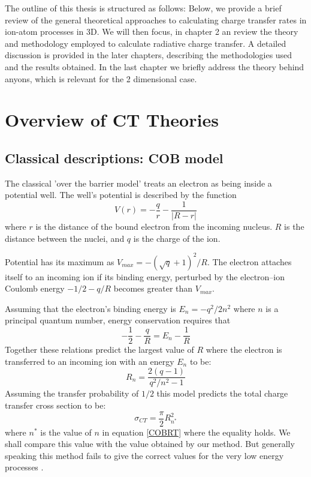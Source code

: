 The outline of this thesis is structured as follows: Below, we provide a brief review of the general theoretical approaches to calculating charge transfer rates in ion-atom processes in 3D. We will then focus, in chapter 2 an review the theory and methodology employed to calculate radiative charge transfer. A detailed discussion is provided in the later chapters, describing the methodologies used and the results obtained. In the last chapter we briefly address the theory behind anyons, which is relevant for the 2 dimensional case.

\section{Overview of CT Theories}
\subsection*{Classical descriptions: COB model}
The classical 'over the barrier model' \cite{BransdenMcDowell1992} treats an electron as being inside a potential well. The well's potential is described by the function
\begin{equation}
  V(r) = -\frac{q}{r} - \frac{1}{\lvert R - r \rvert}
\end{equation}
where $ r $ is the distance of the bound electron from the incoming nucleus. $ R $ is the distance between the nuclei, and $ q $ is the charge of the ion.

Potential has its maximum as $ V_{max} = -\left(\sqrt{q} + 1\right)^2/R $. The electron attaches itself to an incoming ion if its binding energy, perturbed by the electron–ion Coulomb energy $ -1/2 - q/R $ becomes greater than $ V_{max} $.

Assuming that the electron's binding energy is $ E_n = -q^2/2n^2 $ where $ n $ is a principal quantum number, energy conservation requires that
\begin{equation}
  -\frac{1}{2} - \frac{q}{R} = E_n - \frac{1}{R}
\end{equation}
Together these relations predict the largest value of $ R $ where the electron is transferred to an incoming ion with an energy $ E_n $ to be:
\begin{equation}\label{COBRT}
  R_n = \frac{2(q-1)}{q^2/n^2-1}
\end{equation}
Assuming the transfer probability of $ 1/2 $ this model predicts the total charge transfer cross section to be:
\begin{equation}
  \sigma_{CT} = \frac{\pi}{2}R_{n^*}^2
\end{equation}
where $ n^* $ is the value of $ n $ in equation \eqref{COBRT} where the equality holds. We shall compare this value with the value obtained by our method. But generally speaking this method fails to give the correct values for the very low energy processes \cite{osti_6533174}.

